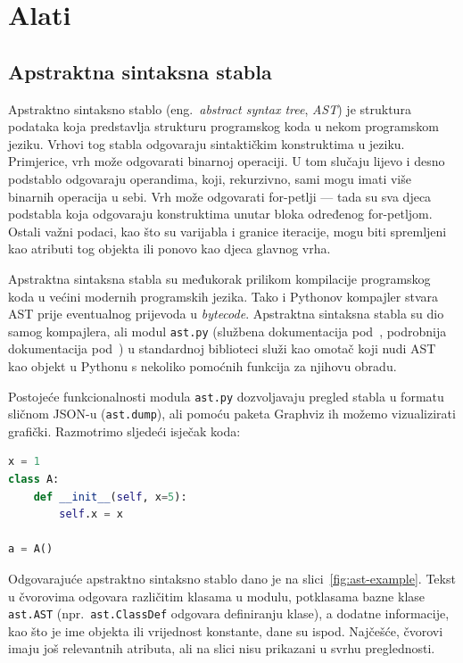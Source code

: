 \section{Alati}

\subsection{Apstraktna sintaksna stabla}
Apstraktno sintaksno stablo (eng.\ \textsl{abstract syntax tree}, \textsl{AST}) je struktura podataka koja predstavlja strukturu programskog koda u nekom programskom jeziku. Vrhovi tog stabla odgovaraju sintaktičkim konstruktima u jeziku. Primjerice, vrh može odgovarati binarnoj operaciji. U tom slučaju lijevo i desno podstablo odgovaraju operandima, koji, rekurzivno, sami mogu imati više binarnih operacija u sebi. Vrh može odgovarati for-petlji --- tada su sva djeca podstabla koja odgovaraju konstruktima unutar bloka određenog for-petljom. Ostali važni podaci, kao što su varijabla i granice iteracije, mogu biti spremljeni kao atributi tog objekta ili ponovo kao djeca glavnog vrha.

Apstraktna sintaksna stabla su međukorak prilikom kompilacije programskog koda u većini modernih programskih jezika. Tako i Pythonov kompajler stvara AST prije eventualnog prijevoda u \emph{bytecode}. Apstraktna sintaksna stabla su dio samog kompajlera, ali modul \texttt{ast.py} (službena dokumentacija pod~\cite{docs:ast}, podrobnija dokumentacija pod~\cite{docs:gts}) u standardnoj biblioteci služi kao omotač koji nudi AST kao objekt u Pythonu s nekoliko pomoćnih funkcija za njihovu obradu.

Postojeće funkcionalnosti modula \texttt{ast.py} dozvoljavaju pregled stabla u formatu sličnom JSON-u (\texttt{ast.dump}), ali pomoću paketa Graphviz ih možemo vizualizirati grafički. Razmotrimo sljedeći isječak koda:
\begin{lstlisting}[language=Python]
x = 1
class A:
    def __init__(self, x=5):
        self.x = x

a = A()
\end{lstlisting}
Odgovarajuće apstraktno sintaksno stablo dano je na slici~\ref{fig:ast-example}.
Tekst u čvorovima odgovara različitim klasama u modulu, potklasama bazne klase \texttt{ast.AST} (npr.\ \texttt{ast.ClassDef} odgovara definiranju klase), a dodatne informacije, kao što je ime objekta ili vrijednost konstante, dane su ispod.
Najčešće, čvorovi imaju još relevantnih atributa, ali na slici nisu prikazani u svrhu preglednosti.


